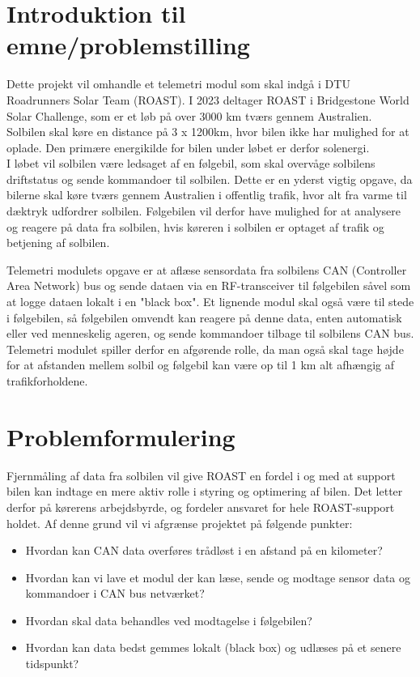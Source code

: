 \documentclass[]{article}
\begin{document}
\section{Introduktion til emne/problemstilling}

Dette projekt vil omhandle et telemetri modul som skal indgå i DTU Roadrunners Solar Team (ROAST). I 2023 deltager ROAST i Bridgestone World Solar Challenge, som er et løb på over 3000 km tværs gennem Australien. Solbilen skal køre en distance på 3 x 1200km, hvor bilen ikke har mulighed for at oplade. Den primære energikilde for bilen under løbet er derfor solenergi.\\
I løbet vil solbilen være ledsaget af en følgebil, som skal overvåge solbilens driftstatus og sende kommandoer til solbilen. Dette er en yderst vigtig opgave, da bilerne skal køre tværs gennem Australien i offentlig trafik, hvor alt fra varme til dæktryk udfordrer solbilen. Følgebilen vil derfor have mulighed for at analysere og reagere på data fra solbilen, hvis køreren i solbilen er optaget af trafik og betjening af solbilen.


Telemetri modulets opgave er at aflæse sensordata fra solbilens CAN (Controller Area Network) bus og sende dataen via en RF-transceiver til følgebilen såvel som at logge dataen lokalt i en "black box". Et lignende modul skal også være til stede i følgebilen, så følgebilen omvendt kan reagere på denne data, enten automatisk eller ved menneskelig ageren, og sende kommandoer tilbage til solbilens CAN bus. Telemetri modulet spiller derfor en afgørende rolle, da man også skal tage højde for at afstanden mellem solbil og følgebil kan være op til 1 km alt afhængig af trafikforholdene.

\section{Problemformulering}
Fjernmåling af data fra solbilen vil give ROAST en fordel i og med at support bilen kan indtage en mere aktiv rolle i styring og optimering af bilen. Det letter derfor på kørerens arbejdsbyrde, og fordeler ansvaret for hele ROAST-support holdet. Af denne grund vil vi afgrænse projektet på følgende punkter: 
\begin{itemize}
    \item Hvordan kan CAN data overføres trådløst i en afstand på en kilometer?
    \item Hvordan kan vi lave et modul der kan læse, sende og modtage sensor data og kommandoer i CAN bus netværket?
    \item Hvordan skal data behandles ved modtagelse i følgebilen?
    \item Hvordan kan data bedst gemmes lokalt (black box) og udlæses på et senere tidspunkt?
\end{itemize}
\end{document}
